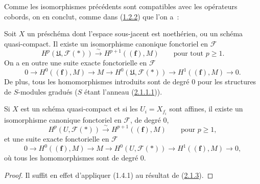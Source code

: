 Comme les isomorphismes précédents sont compatibles avec les opérateurs
cobords, on en conclut, comme dans
(\hyperref[III.1.2.2-fr]{1.2.2}) que l'on a~:

\begin{proposition}[2.1.3]
\label{III.2.1.3-fr}
Soit $X$ un préschéma dont l'espace sous-jacent est noethérien, ou un schéma
quasi-compact. Il existe un isomorphisme canonique fonctoriel en $\mathcal F$
\begin{equation}
\label{III.2.1.3.1-fr}
\tag{2.1.3.1}
H^p(\mathfrak U,\mathcal F(*))
\xrightarrow{\sim}H^{p+1}((\mathbf f),M)
\qquad\text{pour tout }p\geq1.
\end{equation}
On a en outre une suite exacte fonctorielle en $\mathcal F$
\begin{equation}
\label{III.2.1.3.2-fr}
\tag{2.1.3.2}
0\longrightarrow H^0((\mathbf f),M)\longrightarrow M
\longrightarrow H^0(\mathfrak U,\mathcal F(*))
\longrightarrow H^1((\mathbf f),M)\longrightarrow0.
\end{equation}
De plus, tous les homomorphismes introduits sont de degré $0$ pour les
structures de $S$-modules gradués ($S$ étant l'anneau
(\hyperref[III.2.1.1.1-fr]{2.1.1.1})).
\end{proposition}
\providecommand{\bbGamma}{\boldsymbol{\Gamma}}
\providecommand{\shProj}{\mathcal{P}\mathrm{roj}}

\begin{corollary}[2.1.4]
\label{III.2.1.4-fr}
Si $X$ est un schéma quasi-compact et si les $U_i=X_{f_i}$ sont affines,
il existe un isomorphisme canonique fonctoriel en $\mathcal F$, de degré $0$,
\begin{equation}
\label{III.2.1.4.1-fr}
\tag{2.1.4.1}
H^p(U,\mathcal F(*))\xrightarrow{\sim}H^{p+1}((\mathbf f),M)
\qquad\text{pour }p\geq1,
\end{equation}
et une suite exacte fonctorielle en $\mathcal F$
\begin{equation}
\label{III.2.1.4.2-fr}
\tag{2.1.4.2}
0\longrightarrow H^0((\mathbf f),M)\longrightarrow M
\longrightarrow H^0(U,\mathcal F(*))
\longrightarrow H^1((\mathbf f),M)\longrightarrow0,
\end{equation}
où tous les homomorphismes sont de degré $0$.
\end{corollary}

\begin{proof}
Il suffit en effet d'appliquer (1.4.1) au résultat de
(\hyperref[III.2.1.3-fr]{2.1.3}).
\end{proof}

